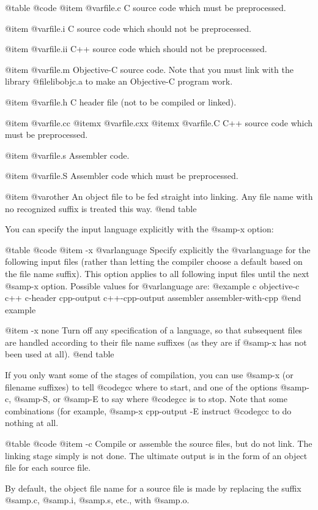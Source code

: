 @table @code
@item @var{file}.c
C source code which must be preprocessed.

@item @var{file}.i
C source code which should not be preprocessed.

@item @var{file}.ii
C++ source code which should not be preprocessed.

@item @var{file}.m
Objective-C source code.  Note that you must link with the library
@file{libobjc.a} to make an Objective-C program work.

@item @var{file}.h
C header file (not to be compiled or linked).

@item @var{file}.cc
@itemx @var{file}.cxx
@itemx @var{file}.C
C++ source code which must be preprocessed.

@item @var{file}.s 
Assembler code.

@item @var{file}.S
Assembler code which must be preprocessed.

@item @var{other}
An object file to be fed straight into linking.
Any file name with no recognized suffix is treated this way.
@end table

You can specify the input language explicitly with the @samp{-x} option:

@table @code
@item -x @var{language}
Specify explicitly the @var{language} for the following input files
(rather than letting the compiler choose a default based on the file
name suffix).  This option applies to all following input files until
the next @samp{-x} option.  Possible values for @var{language} are:
@example
c  objective-c  c++
c-header  cpp-output  c++-cpp-output
assembler  assembler-with-cpp
@end example

@item -x none
Turn off any specification of a language, so that subsequent files are
handled according to their file name suffixes (as they are if @samp{-x}
has not been used at all).
@end table

If you only want some of the stages of compilation, you can use
@samp{-x} (or filename suffixes) to tell @code{gcc} where to start, and
one of the options @samp{-c}, @samp{-S}, or @samp{-E} to say where
@code{gcc} is to stop.  Note that some combinations (for example,
@samp{-x cpp-output -E} instruct @code{gcc} to do nothing at all.

@table @code
@item -c
Compile or assemble the source files, but do not link.  The linking
stage simply is not done.  The ultimate output is in the form of an
object file for each source file.

By default, the object file name for a source file is made by replacing
the suffix @samp{.c}, @samp{.i}, @samp{.s}, etc., with @samp{.o}.

